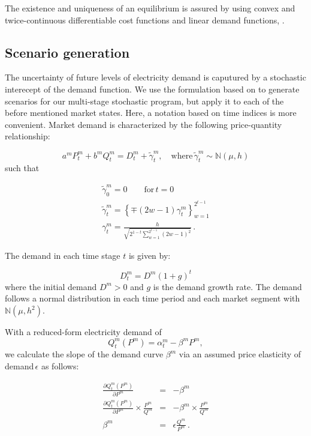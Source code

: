 The existence and uniqueness of an equilibrium is assured by using convex and twice-continuous differentiable cost functions and linear demand functions, \citep[see e.g.][]{Murphy1982}. 


\subsection{Scenario generation}
\label{sec:scenario-generation}

The uncertainty of future levels of electricity demand is caputured by a stochastic interecept of the demand function. We use the formulation based on \cite{Genc2007} to generate scenarios for our multi-stage stochastic program, but apply it to each of the before mentioned market states. Here, a notation based on time indices is more convenient. Market demand is characterized by the following price-quantity relationship:

\begin{equation}
  \label{eq:marketdemandpq}
  a^mP^m_t+b^mQ^m_t=D^m_t+\tilde{\gamma}^m_t, \quad \mbox{where}\, \tilde{\gamma}^m_t\sim\mathbb{N}(\mu,h)
\end{equation}
such that

\begin{eqnarray*}
  \label{eq:3}
  \tilde{\gamma}^m_0=0\qquad\mbox{for}\, t=0\\
   \tilde{\gamma}^m_t=\left\{\mp(2w-1)\gamma^m_t\right\}_{w=1}^{2^{t-1}}\\
   \gamma^m_t=\frac{h}{\sqrt{2^{1-t}\sum_{w=1}^{2^{t-1}}(2w-1)^2}}\,.
\end{eqnarray*}

The demand in each time stage $t$ is given by:

\begin{equation}
  \label{eq:demandgrowth}
  D^m_t = D^m(1+g)^t
\end{equation}
where the initial demand $D^m>0$ and $g$ is the demand growth rate. The demand follows a normal distribution in each time period and each market segment with $\mathbb{N}(\mu, h^2)$.

With a reduced-form electricity demand of
\begin{equation*}
  \label{eq:5}
  Q^m_t(P^m) = \alpha^m_t-\beta^m P^m, 
\end{equation*}
we calculate the slope of the demand curve $\beta^m$  via an assumed price elasticity of demand\,$\epsilon$ as follows:

\begin{eqnarray*}
  \frac{\partial Q^m_t(P^m)}{\partial P^m} &=& -\beta^m \\
  \frac{\partial Q^m_t(P^m)}{\partial P^m}\times\frac{P^m}{Q^m} &=& -\beta^m\times\frac{P^m}{Q^m} \\
\beta^m &=& \epsilon\frac{Q^m}{P^m}\,.
\end{eqnarray*}



